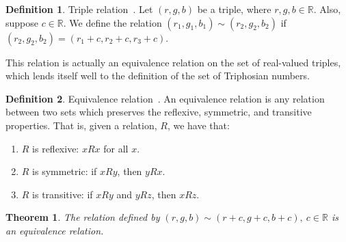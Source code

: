 \documentclass[11pt]{article}
\theoremstyle{definition}
\newtheorem{definition}{Definition}
\theoremstyle{plain}
\newtheorem{theorem}{Theorem}
\theoremstyle{remark}
\begin{document}
	\begin{definition}{Triple relation~\cite{egging}.}
		Let \((r,g,b)\) be a triple, where \(r,g,b \in \mathbb{R}\). Also,
		suppose \(c \in \mathbb{R}\). We define the relation
		\((r_1,g_1,b_1)\sim(r_2,g_2,b_2)\) if \((r_2,g_2,b_2) = (r_1 + c, r_2 +
		c, r_3 + c)\).
	\end{definition}

	This relation is actually an equivalence relation on the set of real-valued
	triples, which lends itself well to the definition of the set of Triphosian
	numbers.

	\begin{definition}{Equivalence relation~\cite{enderton}.}
		An equivalence relation is any relation between two sets which
		preserves the reflexive, symmetric, and transitive properties. That is,
		given a relation, \(R\), we have that:
		\begin{enumerate}
			\item \(R\) is reflexive: \(xRx\) for all \(x\).
			\item \(R\) is symmetric: if \(xRy\), then \(yRx\).
			\item \(R\) is transitive: if \(xRy\) and \(yRz\), then \(xRz\).
		\end{enumerate}
	\end{definition}

	\begin{theorem}
		The relation defined by \((r,g,b)\sim(r+c,g+c,b+c), \ c \in
		\mathbb{R}\) is an equivalence relation.~\cite{egging}
	\end{theorem}
\end{document}
